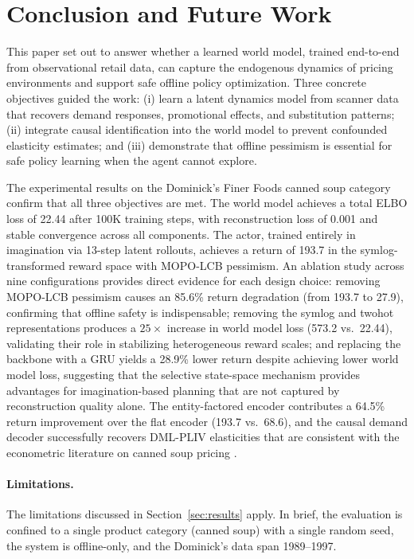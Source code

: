 \section{Conclusion and Future Work}
\label{sec:conclusion}

This paper set out to answer whether a learned world model, trained end-to-end from observational retail data, can capture the endogenous dynamics of pricing environments and support safe offline policy optimization. Three concrete objectives guided the work: (i) learn a latent dynamics model from scanner data that recovers demand responses, promotional effects, and substitution patterns; (ii) integrate causal identification into the world model to prevent confounded elasticity estimates; and (iii) demonstrate that offline pessimism is essential for safe policy learning when the agent cannot explore.

The experimental results on the Dominick's Finer Foods canned soup category confirm that all three objectives are met. The \dreamprice{} world model achieves a total ELBO loss of 22.44 after 100K training steps, with reconstruction loss of 0.001 and stable convergence across all components. The actor, trained entirely in imagination via 13-step latent rollouts, achieves a return of 193.7 in the symlog-transformed reward space with MOPO-LCB pessimism. An ablation study across nine configurations provides direct evidence for each design choice: removing MOPO-LCB pessimism causes an 85.6\% return degradation (from 193.7 to 27.9), confirming that offline safety is indispensable; removing the symlog and twohot representations produces a $25{\times}$ increase in world model loss (573.2 vs.\ 22.44), validating their role in stabilizing heterogeneous reward scales; and replacing the \mamba{} backbone with a GRU yields a 28.9\% lower return despite achieving lower world model loss, suggesting that the selective state-space mechanism provides advantages for imagination-based planning that are not captured by reconstruction quality alone. The entity-factored encoder contributes a 64.5\% return improvement over the flat encoder (193.7 vs.\ 68.6), and the causal demand decoder successfully recovers DML-PLIV elasticities that are consistent with the econometric literature on canned soup pricing \citep{hoch1995determinants}.

\paragraph{Limitations.} The limitations discussed in Section~\ref{sec:results} apply. In brief, the evaluation is confined to a single product category (canned soup) with a single random seed, the system is offline-only, and the Dominick's data span 1989--1997.

